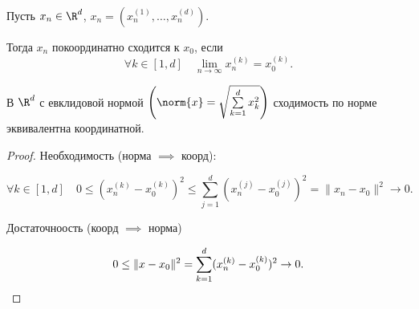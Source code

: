 \begin{definition} \thmslashn 

    Пусть $x_{n}\in \R^{d}$, $x_{n} = (x_n^{(1)}, \ldots, x_{n}^{(d)})$.

    Тогда $x_{n}$ покоординатно сходится к $x_0$, если
    \[ \forall{k\in [1, d]}\quad \lim\limits_{n \to \infty} x_{n}^{(k)} = x_0^{(k)} .\] 
\end{definition}
\begin{theorem} \label{q20_th2.7} \thmslashn

    В $\R^{d}$ с евклидовой нормой $\left( \norm{x} = \sqrt{\sum\limits_{k=1}^{d} x_{k}^2}  \right) $ сходимость по норме эквивалентна координатной.
    \begin{proof} \thmslashn
    
        Необходимость (норма $\implies$ коорд):

        \[ \forall{k\in [1, d]}\quad 0 \le (x_{n}^{(k)} - x_0^{(k)})^2 \le \sum\limits_{j=1}^{d} (x_{n}^{(j)} - x_{0}^{(j)})^2 = \|x_{n} - x_0\|^2 \to 0.\]

    Достаточноость (коорд $\implies$ норма)

    \[ 0 \le \|x - x_0\|^2 = \sum\limits_{k=1}^{d} (x_{n}^{(k)} - x_{0}^{(k)})^2 \to 0. \qedhere\] 
    \end{proof}
\end{theorem}
